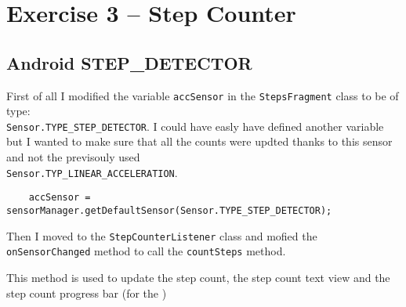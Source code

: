 \section{Exercise 3 – Step Counter}

\subsection{Android STEP\_DETECTOR}

First of all I modified the variable \texttt{accSensor} in the \texttt{StepsFragment} class to be of type:\\ \texttt{Sensor.TYPE\_STEP\_DETECTOR}. I could have easly have defined another variable but I wanted to make sure that all the counts were updted thanks to this sensor and not the previsouly used\\ \texttt{Sensor.TYP\_LINEAR\_ACCELERATION}.

\begin{verbatim}
    accSensor = sensorManager.getDefaultSensor(Sensor.TYPE_STEP_DETECTOR);
\end{verbatim}

Then I moved to the \texttt{StepCounterListener} class and mofied the \texttt{onSensorChanged} method to call the \texttt{countSteps} method. 





This method is used to update the step count, the step count text view and the step count progress bar (for the )